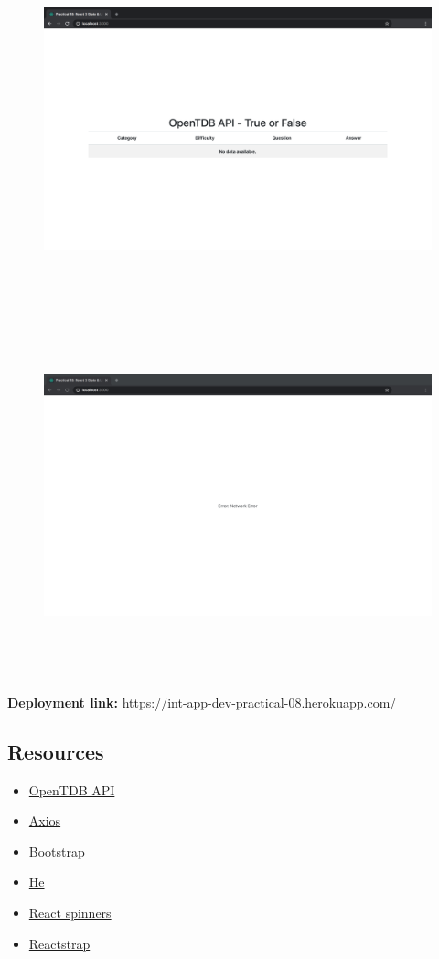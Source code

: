 \documentclass{article}
\begin{document}
\begin{figure}[H]
  \includegraphics[width=175mm, height=105mm]{./img/18-expected-opentdb-3.png}
  \includegraphics[width=175mm, height=105mm]{./img/18-expected-opentdb-4.png}
\end{figure}

\textbf{Deployment link:} \href{https://int-app-dev-practical-18.herokuapp.com/}{https://int-app-dev-practical-08.herokuapp.com/} 

\subsection*{Resources} 
\begin{itemize}
  \item \href{https://opentdb.com/}{OpenTDB API}
  \item \href{https://www.npmjs.com/package/axios/}{Axios}
  \item \href{https://getbootstrap.com/}{Bootstrap}
  \item \href{https://www.npmjs.com/package/he/}{He}
  \item \href{https://www.npmjs.com/package/react-spinners/}{React spinners}
  \item \href{https://www.npmjs.com/package/reactstrap/}{Reactstrap}
\end{itemize}
 
\end{document}
